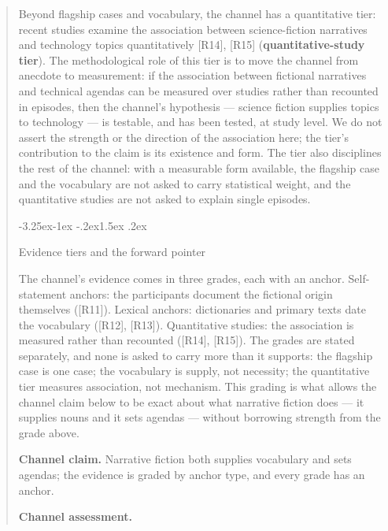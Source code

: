 \documentclass[11pt,a4paper]{article}
\makeatletter
\renewcommand\subsection{\@startsection{subsection}{2}{\z@}%
  {-3.25ex\@plus -1ex \@minus -.2ex}{1.5ex \@plus .2ex}%
  {\normalfont\large\bfseries\raggedright}}
\makeatother
\begin{document}
\begin{abstract}
Beyond flagship cases and vocabulary, the channel has a quantitative tier: recent studies examine the association between science-fiction narratives and technology topics quantitatively [R14], [R15] (\textbf{quantitative-study tier}). The methodological role of this tier is to move the channel from anecdote to measurement: if the association between fictional narratives and technical agendas can be measured over studies rather than recounted in episodes, then the channel's hypothesis — science fiction supplies topics to technology — is testable, and has been tested, at study level. We do not assert the strength or the direction of the association here; the tier's contribution to the claim is its existence and form. The tier also disciplines the rest of the channel: with a measurable form available, the flagship case and the vocabulary are not asked to carry statistical weight, and the quantitative studies are not asked to explain single episodes.

\subsection{Evidence tiers and the forward pointer}

The channel's evidence comes in three grades, each with an anchor. Self-statement anchors: the participants document the fictional origin themselves ([R11]). Lexical anchors: dictionaries and primary texts date the vocabulary ([R12], [R13]). Quantitative studies: the association is measured rather than recounted ([R14], [R15]). The grades are stated separately, and none is asked to carry more than it supports: the flagship case is one case; the vocabulary is supply, not necessity; the quantitative tier measures association, not mechanism. This grading is what allows the channel claim below to be exact about what narrative fiction does — it supplies nouns and it sets agendas — without borrowing strength from the grade above.

\textbf{Channel claim.} Narrative fiction both supplies vocabulary and sets agendas; the evidence is graded by anchor type, and every grade has an anchor.

\textbf{Channel assessment.}


\end{abstract}
\end{document}
